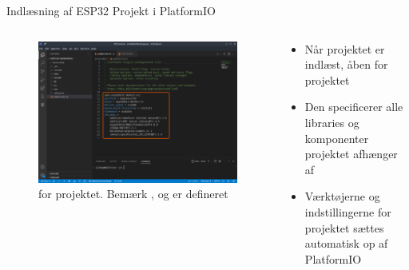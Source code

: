 \documentclass[aspectratio=169]{beamer}
\begin{document}
\begin{frame}{Indlæsning af ESP32 Projekt i PlatformIO}
\begin{columns}
	\begin{column}{0.5\textwidth}
		\begin{figure}
  			\includegraphics[width=\textwidth,keepaspectratio=true]{assets/pictures/pio-projects-6.png}
  			\caption{ for  projektet. Bemærk ,  og  er defineret}
  			\label{fig:pio-project6}
		\end{figure}
	\end{column}
	\begin{column}{0.5\textwidth}
		\begin{textBox}
			\begin{itemize}
				\item Når projektet er indlæst, åben  for projektet
				\item Den specificerer alle libraries og komponenter projektet afhænger af
				\item Værktøjerne og indstillingerne for projektet sættes automatisk op af PlatformIO
			\end{itemize}
		\end{textBox}
	\end{column}
\end{columns}
\end{frame}
\end{document}
